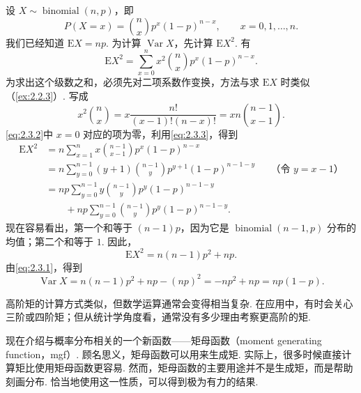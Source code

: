 \begin{example}[二项分布的方差]\label{ex:2.3.5}
设 $X\sim\operatorname{binomial}(n,p)$，即
$$P(X=x)=\binom nx p^x(1-p)^{n-x},\qquad x=0,1,\ldots,n.$$
我们已经知道 $\mathrm EX=np$. 为计算 $\operatorname{Var}X$，先计算 $\mathrm EX^2$. 有
\begin{equation}\label{eq:2.3.2}
\mathrm EX^2=\sum_{x=0}^n x^2\binom nx p^x(1-p)^{n-x}.
\end{equation}
为求出这个级数之和，必须先对二项系数作变换，方法与求 $\mathrm EX$ 时类似（\autoref{ex:2.2.3}）. 写成
\begin{equation}\label{eq:2.3.3}
x^2\binom nx=x\frac{n!}{(x-1)!(n-x)!}=xn\binom{n-1}{x-1}.
\end{equation}
\eqref{eq:2.3.2}中 $x=0$ 对应的项为零，利用\eqref{eq:2.3.3}，得到
$$\begin{aligned}
\mathrm EX^2&=n\sum_{x=1}^n x\binom{n-1}{x-1}p^x(1-p)^{n-x}\\
&=n\sum_{y=0}^{n-1}(y+1)\binom{n-1}y p^{y+1}(1-p)^{n-1-y}&&\text{（令 $y=x-1$）}\\
&=np\sum_{y=0}^{n-1}y\binom{n-1}y p^y(1-p)^{n-1-y}\\
&\qquad+np\sum_{y=0}^{n-1}\binom{n-1}y p^y(1-p)^{n-1-y}.
\end{aligned}$$
现在容易看出，第一个和等于 $(n-1)p$，因为它是 $\operatorname{binomial}(n-1,p)$ 分布的均值；第二个和等于 $1$. 因此，
\begin{equation}\label{eq:2.3.4}
\mathrm EX^2=n(n-1)p^2+np.
\end{equation}
由\eqref{eq:2.3.1}，得到
$$\operatorname{Var}X=n(n-1)p^2+np-(np)^2=-np^2+np=np(1-p).$$
\end{example}

高阶矩的计算方式类似，但数学运算通常会变得相当复杂. 在应用中，有时会关心三阶或四阶矩；但从统计学角度看，通常没有多少理由考察更高阶的矩.

现在介绍与概率分布相关的一个新函数——矩母函数（moment generating function，mgf）. 顾名思义，矩母函数可以用来生成矩. 实际上，很多时候直接计算矩比使用矩母函数更容易. 然而，矩母函数的主要用途并不是生成矩，而是帮助刻画分布. 恰当地使用这一性质，可以得到极为有力的结果.

